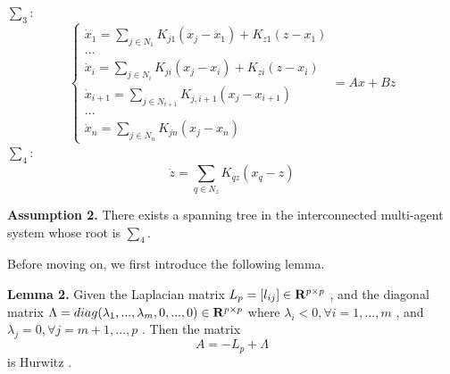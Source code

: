 \documentclass[english]{cccconf}
\begin{document}
{{$\sum_3$:
\[\left\{ \begin{array}{l}
{{\dot x}_1} = \sum\limits_{j \in {N_1}} {K_{j1}^{}({x_j} - {x_1})}  + K_{z1}(z - {x_1})\\
...\\
{{\dot x}_i} = \sum\limits_{j \in {N_i}} {K_{ji}^{}({x_j} - {x_i})}  + K_{zi}(z - {x_i})\\
{{\dot x}_{i + 1}} = \sum\limits_{j \in {N_{i + 1}}} {K_{j,i+1}^{}({x_j} - {x_{i + 1}})} \\
...\\
{{\dot x}_n} = \sum\limits_{j \in {N_{n
}}} {K_{jn}^{}({x_j} - {x_n})}
\end{array} \right. = Ax + Bz\]
$\sum_4$:
\[\dot z = \sum\limits_{q \in {N_z}}^{} {{K_{qz}}({x_q} - z)} \]


{\textbf{Assumption 2.}} There exists a spanning tree in the interconnected multi-agent system whose root is  $\sum_4$.

Before moving on, we first introduce the following lemma.

{\textbf{Lemma 2.}} Given the Laplacian matrix ${L_p} = [{l_{ij}}] \in {{\bf{R}}^{p \times p}}$ , and the diagonal matrix  $\Lambda  = diag({\lambda _1},...,{\lambda _m},0,...,0) \in {{\bf{R}}^{p \times p}}$ where ${\lambda _i} < 0,\forall i = 1,...,m$ , and  ${\lambda _j} = 0,\forall j = m + 1,...,p$ .
Then the matrix
\[A =  - {L_p} + \Lambda \]
is Hurwitz .

}}
\end{document}
